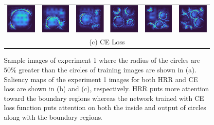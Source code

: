 \documentclass[letterpaper]{article} %
\begin{document}
\begin{figure}[!htbp]
\begin{tabular}{cccccc}
\multicolumn{1}{c}{\includegraphics[width=0.125\columnwidth]{saliency/ce/circle/circle_1.png}} \hspace{-12pt} &  \multicolumn{1}{c}{\includegraphics[width=0.125\columnwidth]{saliency/ce/circle/circle_2.png}} \hspace{-12pt} & \multicolumn{1}{c}{\includegraphics[width=0.125\columnwidth]{saliency/ce/circle/circle_3.png}} \hspace{-12pt} & \multicolumn{1}{c}{\includegraphics[width=0.125\columnwidth]{saliency/ce/circle/circle_4.png}} \hspace{-12pt} & \multicolumn{1}{c}{\includegraphics[width=0.125\columnwidth]{saliency/ce/circle/circle_5.png}} \hspace{-12pt} & \multicolumn{1}{c}{\includegraphics[width=0.125\columnwidth]{saliency/ce/circle/circle_6.png}} \\
\multicolumn{6}{c}{(c) CE Loss}
\end{tabular}
\caption{Sample images of experiment 1 where the radius of the circles are $50\%$ greater than the circles of training images are shown in (a). Saliency maps of the experiment 1 images for both HRR and CE loss are shown in (b) and (c), respectively. HRR puts more attention toward the boundary regions whereas the network trained with CE loss function puts attention on both the inside and output of circles along with the boundary regions.}
\label{fig:exp_1_saliency}
\end{figure}
\end{document}
